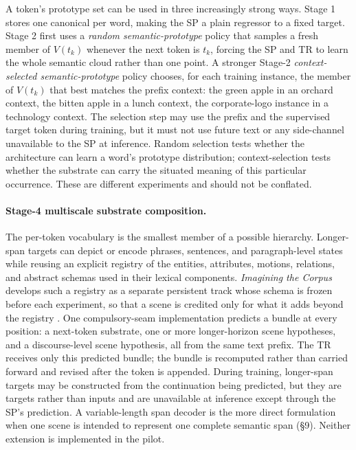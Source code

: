 \documentclass[11pt,a4paper]{article}
\begin{document}
A token's prototype set can be used in three increasingly strong ways. Stage 1 stores one canonical per word, making the SP a plain regressor to a fixed target. Stage 2 first uses a \emph{random semantic-prototype} policy that samples a fresh member of $V(t_k)$ whenever the next token is $t_k$, forcing the SP and TR to learn the whole semantic cloud rather than one point. A stronger Stage-2 \emph{context-selected semantic-prototype} policy chooses, for each training instance, the member of $V(t_k)$ that best matches the prefix context: the green apple in an orchard context, the bitten apple in a lunch context, the corporate-logo instance in a technology context. The selection step may use the prefix and the supervised target token during training, but it must not use future text or any side-channel unavailable to the SP at inference. Random selection tests whether the architecture can learn a word's prototype distribution; context-selection tests whether the substrate can carry the situated meaning of this particular occurrence. These are different experiments and should not be conflated.

\paragraph{Stage-4 multiscale substrate composition.} The per-token vocabulary is the smallest member of a possible hierarchy. Longer-span targets can depict or encode phrases, sentences, and paragraph-level states while reusing an explicit registry of the entities, attributes, motions, relations, and abstract schemas used in their lexical components. \emph{Imagining the Corpus} develops such a registry as a separate persistent track whose schema is frozen before each experiment, so that a scene is credited only for what it adds beyond the registry \cite{documentworld2026}. One compulsory-seam implementation predicts a bundle at every position: a next-token substrate, one or more longer-horizon scene hypotheses, and a discourse-level scene hypothesis, all from the same text prefix. The TR receives only this predicted bundle; the bundle is recomputed rather than carried forward and revised after the token is appended. During training, longer-span targets may be constructed from the continuation being predicted, but they are targets rather than inputs and are unavailable at inference except through the SP's prediction. A variable-length span decoder is the more direct formulation when one scene is intended to represent one complete semantic span (§9). Neither extension is implemented in the pilot.
\end{document}

